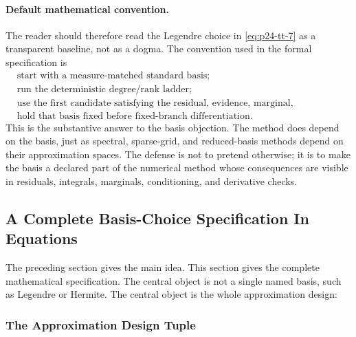 \documentclass[11pt]{article}
\numberwithin{equation}{section}
\begin{document}
\paragraph{Default mathematical convention.}
The reader should therefore read the Legendre choice in
\eqref{eq:p24-tt-7} as a transparent baseline, not as a dogma.  The convention
used in the formal specification is
\begin{equation}
\begin{aligned}
    &\text{start with a measure-matched standard basis;}\\
    &\text{run the deterministic degree/rank ladder;}\\
    &\text{use the first candidate satisfying the residual, evidence, marginal,
      conditioning, and derivative criteria;}\\
    &\text{hold that basis fixed before fixed-branch differentiation.}
\end{aligned}
    \label{eq:p30-basis-policy}
\end{equation}
This is the substantive answer to the basis objection.  The method does
depend on the basis, just as spectral, sparse-grid, and reduced-basis methods
depend on their approximation spaces.  The defense is not to pretend
otherwise; it is to make the basis a declared part of the numerical method
whose consequences are visible in residuals, integrals, marginals,
conditioning, and derivative checks.

\subsection{A Complete Basis-Choice Specification In Equations}
\label{subsec:p33-complete-basis-audit}

The preceding section gives the main idea.  This section gives the complete
mathematical specification.  The central object is not a single named basis,
such as Legendre or Hermite.  The central object is the
whole approximation design:

\subsubsection{The Approximation Design Tuple}
\end{document}
